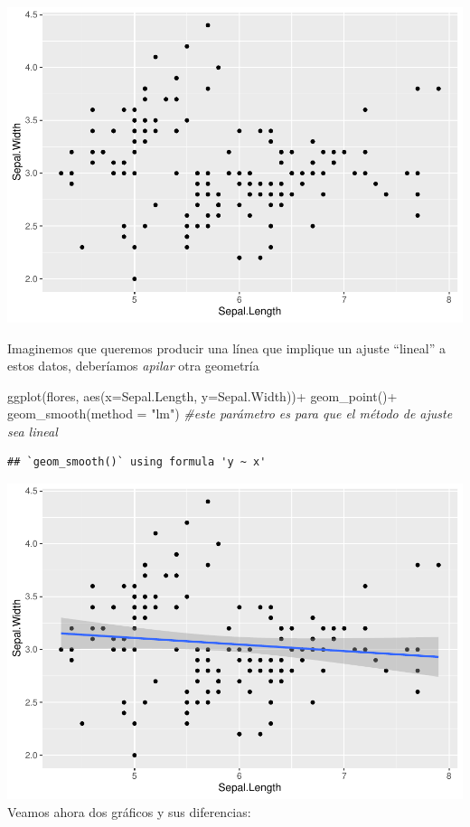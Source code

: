 \documentclass[
]{book}
\newenvironment{Shaded}{\begin{snugshade}}{\end{snugshade}}
\newcommand{\AttributeTok}[1]{\textcolor[rgb]{0.77,0.63,0.00}{#1}}
\newcommand{\CommentTok}[1]{\textcolor[rgb]{0.56,0.35,0.01}{\textit{#1}}}
\newcommand{\FunctionTok}[1]{\textcolor[rgb]{0.00,0.00,0.00}{#1}}
\newcommand{\NormalTok}[1]{#1}
\newcommand{\SpecialCharTok}[1]{\textcolor[rgb]{0.00,0.00,0.00}{#1}}
\newcommand{\StringTok}[1]{\textcolor[rgb]{0.31,0.60,0.02}{#1}}
\begin{document}
\includegraphics{Esatadistica_en_R_files/figure-latex/unnamed-chunk-148-1.pdf}

Imaginemos que queremos producir una línea que implique un ajuste ``lineal'' a estos datos, deberíamos \emph{apilar} otra geometría

\begin{Shaded}
\begin{Highlighting}[]
\FunctionTok{ggplot}\NormalTok{(flores, }\FunctionTok{aes}\NormalTok{(}\AttributeTok{x=}\NormalTok{Sepal.Length, }\AttributeTok{y=}\NormalTok{Sepal.Width))}\SpecialCharTok{+}
  \FunctionTok{geom\_point}\NormalTok{()}\SpecialCharTok{+}
  \FunctionTok{geom\_smooth}\NormalTok{(}\AttributeTok{method =} \StringTok{"lm"}\NormalTok{) }\CommentTok{\#este parámetro es para que el método de ajuste sea lineal}
\end{Highlighting}
\end{Shaded}

\begin{verbatim}
## `geom_smooth()` using formula 'y ~ x'
\end{verbatim}

\includegraphics{Esatadistica_en_R_files/figure-latex/unnamed-chunk-149-1.pdf}
Veamos ahora dos gráficos y sus diferencias:
\end{document}
